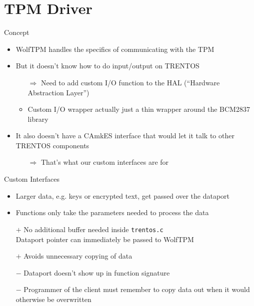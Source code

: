 \section{TPM Driver}

\begin{frame}{Concept}
\begin{itemize}
\item WolfTPM handles the specifics of communicating with the TPM
\item But it doesn't know how to do input/output on TRENTOS
  \begin{itemize}
  \item[$\Rightarrow$] Need to add custom I/O function to the HAL (``Hardware Abstraction Layer'')
  \item Custom I/O wrapper actually just a thin wrapper around the BCM2837 library
  \end{itemize}
\item It also doesn't have a CAmkES interface that would let it talk to other TRENTOS components
  \begin{itemize}
  \item[$\Rightarrow$] That's what our custom interfaces are for
  \end{itemize}
\end{itemize}
\end{frame}

\begin{frame}{Custom Interfaces}
\begin{itemize}
\item Larger data, e.g. keys or encrypted text, get passed over the dataport
\item Functions only take the parameters needed to process the data
\item[$+$] No additional buffer needed inside \texttt{trentos.c}\\
    Dataport pointer can immediately be passed to WolfTPM
\item[$+$] Avoids unnecessary copying of data
\item[$-$] Dataport doesn't show up in function signature
\item[$-$] Programmer of the client must remember to copy data out when it would otherwise be overwritten
\end{itemize}
\end{frame}

